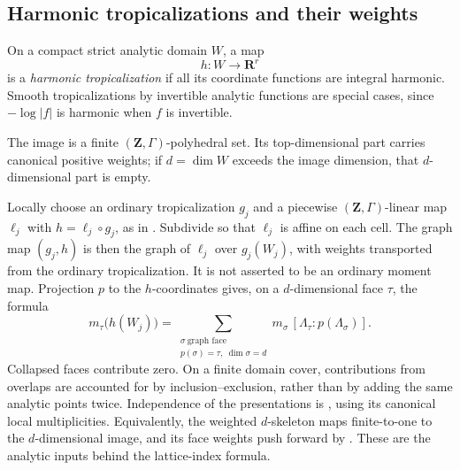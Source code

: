 \subsection{Harmonic tropicalizations and their weights}
\label{sec:ch18-harmonic-trop-def}

\begin{definition}
\label{def:ch18-harmonic-tropicalization}
On a compact strict analytic domain $W$, a map
\[
                              h:W\to\mathbf R^r
\]
is a \emph{harmonic tropicalization} if all its coordinate functions are
integral harmonic.  Smooth tropicalizations by invertible analytic functions
are special cases, since $-\log|f|$ is harmonic when $f$ is invertible.
\end{definition}

The image is a finite $(\mathbf Z,\Gamma)$-polyhedral set.  Its
top-dimensional part carries canonical positive weights; if
$d=\dim W$ exceeds the image dimension, that $d$-dimensional part is empty.

Locally choose an ordinary tropicalization $g_j$ and a piecewise
$(\mathbf Z,\Gamma)$-linear map $\ell_j$ with $h=\ell_j\circ g_j$, as in
\cite[\S8.4]{GJR26}.  Subdivide so that $\ell_j$ is affine on
each cell.  The graph map $(g_j,h)$ is then the graph of $\ell_j$ over
$g_j(W_j)$, with weights transported from the ordinary tropicalization.
It is not asserted to be an ordinary moment map.  Projection $p$ to the
$h$-coordinates gives, on a $d$-dimensional face $\tau$, the formula
\begin{equation}
\label{eq:ch18-harmonic-weight}
 m_\tau\bigl(h(W_j)\bigr)
 =\sum_{\substack{\sigma\ \text{graph face}\\p(\sigma)=\tau,\
                         \dim\sigma=d}}
 m_\sigma\,[\Lambda_\tau:p(\Lambda_\sigma)].
\end{equation}
Collapsed faces contribute zero.  On a finite domain cover, contributions
from overlaps are accounted for by inclusion--exclusion, rather than by
adding the same analytic points twice.  Independence of the presentations
is \cite[Definition~8.10 and Proposition~8.25]{GJR26}, using its canonical
local multiplicities.  Equivalently, the weighted $d$-skeleton maps
finite-to-one to the $d$-dimensional image, and its face weights push
forward by \cite[(8.15.1)]{GJR26}.  These are the analytic inputs behind
the lattice-index formula.

